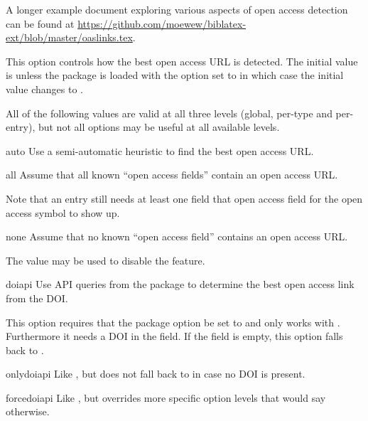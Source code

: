 \documentclass[DIV=9]{scrartcl}
\begin{document}
A longer example document exploring various aspects of open access
detection can be found at
\url{https://github.com/moewew/biblatex-ext/blob/master/oaslinks.tex}.

\begin{optionlist}

This option controls how the best open access URL is detected.
The initial value is  unless the package is loaded with the
 option set to  in which case the initial
value changes to .

All of the following values are valid at all three levels (global,
per-type and per-entry), but not all options may be useful at all
available levels.
\begin{valuelist}
\item[auto] Use a semi-automatic heuristic to find the best open access URL.

\item[all] Assume that all known \enquote{open access fields} contain an open
  access URL.

  Note that an entry still needs at least one field that open access field
  for the open access symbol to show up.

\item[none] Assume that no known \enquote{open access field} contains an open
  access URL.

  The value  may be used to disable the  feature.

\item[doiapi] Use API queries from the  package
  to determine the best open access link from the DOI.

  \begin{warnbox}
  This option requires that the  package option be
  set to  and only works with \lualatex.
  Furthermore it needs a DOI in the  field.
  If the  field is empty, this option falls back to .
  \end{warnbox}

\item[onlydoiapi] Like , but does not fall back to 
  in case no DOI is present.

\item[forcedoiapi] Like , but overrides more specific option
  levels that would say otherwise.


\end{valuelist}
\end{optionlist}
\end{document}
